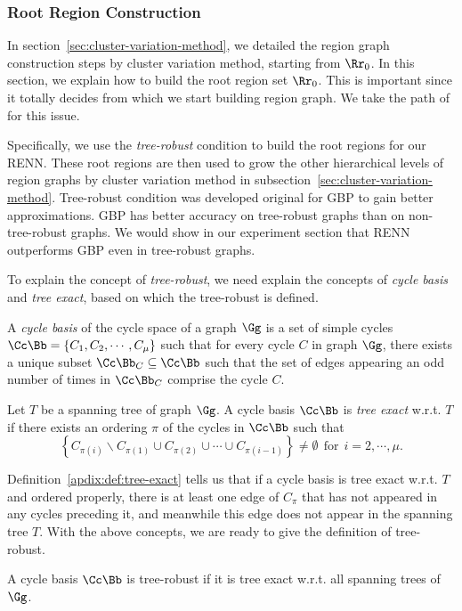 \subsubsection{Root Region Construction}
\label{sec:criteria-root-regions}
In section~\ref{sec:cluster-variation-method}, we detailed the region graph construction steps by cluster variation method, starting from $\Rr_0$. In this section, we explain how to build the root region set $\Rr_0$. This is important since it totally decides from which we start building region graph.
We take the path of \cite{welling2005structured, gelfand2012generalized} for this issue.

Specifically, we use the \textit{tree-robust} condition \cite{gelfand2012generalized} to build the root regions for our RENN. These root regions are then used to grow the other hierarchical levels of region graphs by cluster variation method in subsection~\ref{sec:cluster-variation-method}. Tree-robust condition was developed original for GBP to gain better approximations. GBP has better accuracy on tree-robust graphs than on non-tree-robust graphs. We would show in our experiment section that RENN outperforms GBP even in tree-robust graphs. 


To explain the concept of \textit{tree-robust}, we need explain the concepts of \textit{cycle basis} and \textit{tree exact}, based on which the tree-robust is defined.
\begin{definition}\label{apdix:def:cycle-basis}
  A \textit{cycle basis} of the cycle space of a graph $\Gg$ is a
  set of simple cycles $\Cc\Bb =\left\{ C_1, C_2, \cdots, C_{\mu}
  \right\}$ such that for every cycle $C$ in graph $\Gg$, there
  exists a unique subset $\Cc\Bb_{C} \subseteq \Cc\Bb$ such that the
  set of edges appearing an odd number of times in $\Cc\Bb_C$ comprise the cycle $C$.
\end{definition}
\begin{definition}\label{apdix:def:tree-exact}
  Let $T$ be a spanning tree of graph $\Gg$. A cycle basis $\Cc\Bb$ is \textit{tree exact} w.r.t. $T$ if there exists an ordering $\pi$ of the cycles in $\Cc\Bb$ such that
\begin{equation*}
  \left\{ C_{\pi(i)} \backslash C_{\pi(1)} \cup C_{\pi(2)} \cup \cdots \cup C_{\pi(i-1)} \right\} \neq \emptyset~~\mathrm{for}~~ i=2,\cdots, \mu.
  \end{equation*}
\end{definition}
Definition~\ref{apdix:def:tree-exact} tells us that if a cycle basis is tree exact w.r.t. $T$ and ordered properly, there is at least one edge of $C_{\pi}$ that has not appeared in any cycles preceding it, and meanwhile this edge does not appear in the spanning tree $T$.
With the above concepts, we are ready to give the definition of tree-robust.
\begin{definition}
  A cycle basis $\Cc\Bb$ is tree-robust if it is tree exact w.r.t. all spanning trees of $\Gg$.
\end{definition}



